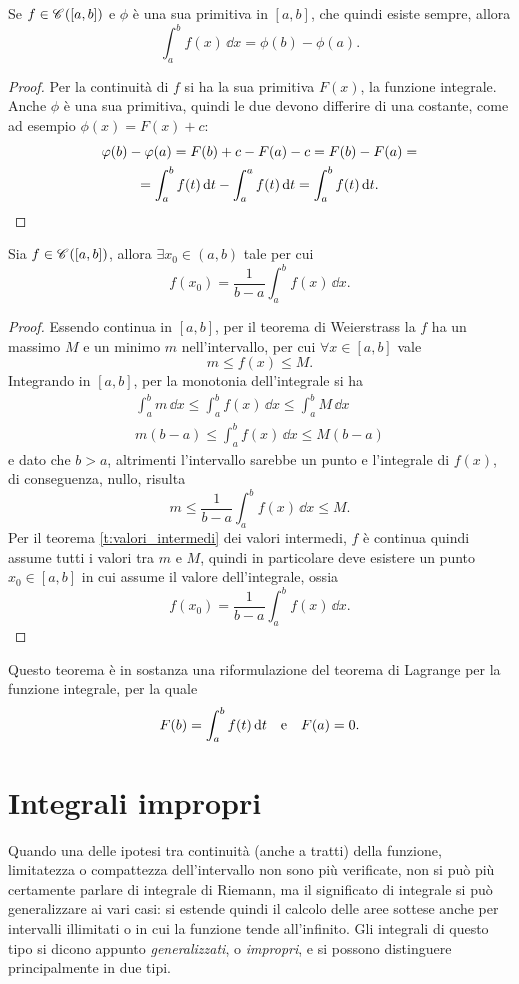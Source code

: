 \begin{teorema} \label{t:tfci2}
Se $f\in\mathscr C^{}([a,b])$ e $\phi$ è una sua primitiva in $[a,b]$, che quindi esiste sempre, allora
\begin{equation}
\int_a^bf(x)\,\dd x=\phi(b)-\phi(a).
\end{equation}
\end{teorema}
\begin{proof}
Per la continuità di $f$ si ha la sua primitiva $F(x)$, la funzione integrale. Anche $\phi$ è una sua primitiva, quindi le due devono differire di una costante, come ad esempio $\phi(x)=F(x)+c$:
\begin{multline*}
\varphi(b)-\varphi(a)=F(b)+c-F(a)-c=F(b)-F(a)=\\
=\int_a^bf(t)\,\textup{d} t-\int_a^af(t)\,\textup{d} t=\int_a^bf(t)\,\textup{d} t.\qedhere
\end{multline*}
\end{proof}
\begin{teorema} \label{t:media-integrale}
Sia $f\in\mathscr C^{}([a,b])$, allora $\exists x_0\in(a,b)$ tale per cui
\begin{equation}
f(x_0)=\frac1{b-a}\int_a^bf(x)\,\dd x.
\end{equation}
\end{teorema}
\begin{proof}
Essendo continua in $[a,b]$, per il teorema di Weierstrass la $f$ ha un massimo $M$ e un minimo $m$ nell'intervallo, per cui $\forall x\in[a,b]$ vale
\[
m\leq f(x)\leq M.
\]
Integrando in $[a,b]$, per la monotonia dell'integrale si ha
\begin{gather*}
\int_a^bm\,\dd x\leq\int_a^bf(x)\,\dd x\leq\int_a^bM\,\dd x\\
m(b-a)\leq\int_a^bf(x)\,\dd x\leq M(b-a)
\end{gather*}
e dato che $b>a$, altrimenti l'intervallo sarebbe un punto e l'integrale di $f(x)$, di conseguenza, nullo, risulta
\[
m\leq\frac1{b-a}\int_a^bf(x)\,\dd x\leq M.
\]
Per il teorema \ref{t:valori_intermedi} dei valori intermedi, $f$ è continua quindi assume tutti i valori tra $m$ e $M$, quindi in particolare deve esistere un punto $x_0\in[a,b]$ in cui assume il valore dell'integrale, ossia
\[
f(x_0)=\frac1{b-a}\int_a^bf(x)\,\dd x.
\]
\end{proof}
Questo teorema è in sostanza una riformulazione del teorema di Lagrange per la funzione integrale, per la quale
\[
F(b)=\int_a^bf(t)\,\textup{d} t\quad\text{e}\quad F(a)=0.
\]

\section{Integrali impropri}
Quando una delle ipotesi tra continuità (anche a tratti) della funzione, limitatezza o compattezza dell'intervallo non sono più verificate, non si può più certamente parlare di integrale di Riemann, ma il significato di integrale si può generalizzare ai vari casi: si estende quindi il calcolo delle aree sottese anche per intervalli illimitati o in cui la funzione tende all'infinito. Gli integrali di questo tipo si dicono appunto \emph{generalizzati}, o \emph{impropri}, e si possono distinguere principalmente in due tipi.
